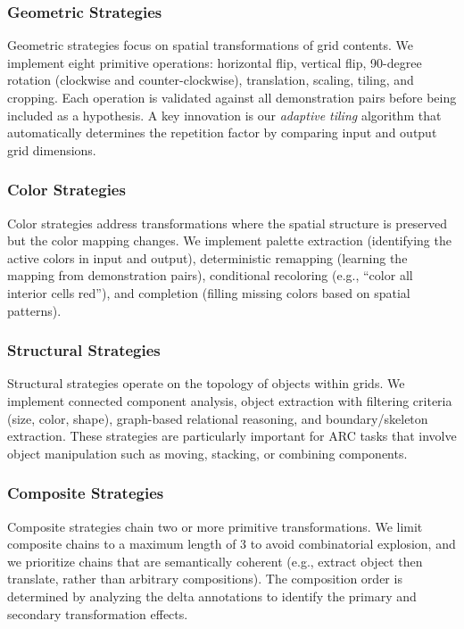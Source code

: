 \documentclass[conference,10pt,letterpaper]{IEEEtran}
\begin{document}
\subsubsection{Geometric Strategies}

Geometric strategies focus on spatial transformations of grid contents. We implement eight primitive operations: horizontal flip, vertical flip, 90-degree rotation (clockwise and counter-clockwise), translation, scaling, tiling, and cropping. Each operation is validated against all demonstration pairs before being included as a hypothesis. A key innovation is our \emph{adaptive tiling} algorithm that automatically determines the repetition factor by comparing input and output grid dimensions.

\subsubsection{Color Strategies}

Color strategies address transformations where the spatial structure is preserved but the color mapping changes. We implement palette extraction (identifying the active colors in input and output), deterministic remapping (learning the mapping from demonstration pairs), conditional recoloring (e.g., ``color all interior cells red''), and completion (filling missing colors based on spatial patterns).

\subsubsection{Structural Strategies}

Structural strategies operate on the topology of objects within grids. We implement connected component analysis, object extraction with filtering criteria (size, color, shape), graph-based relational reasoning, and boundary/skeleton extraction. These strategies are particularly important for ARC tasks that involve object manipulation such as moving, stacking, or combining components.

\subsubsection{Composite Strategies}

Composite strategies chain two or more primitive transformations. We limit composite chains to a maximum length of 3 to avoid combinatorial explosion, and we prioritize chains that are semantically coherent (e.g., extract object then translate, rather than arbitrary compositions). The composition order is determined by analyzing the delta annotations to identify the primary and secondary transformation effects.
\end{document}
